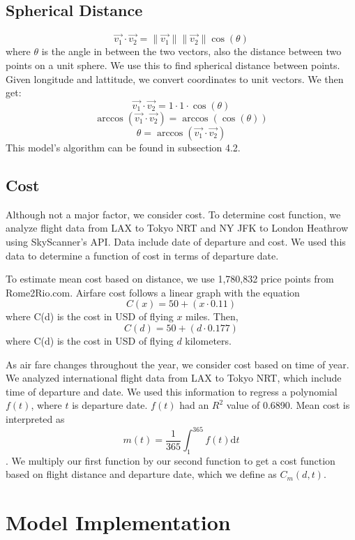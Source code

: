 \subsection{Spherical Distance}
$$\vec{v_1} \cdot \vec{v_2} = \|\vec{v_1}\| \|\vec{v_2}\| \cos(\theta)$$
where $\theta$ is the angle in between the two vectors, also the distance between two points on a unit sphere. We use this to find spherical distance between points. Given longitude and lattitude, we convert coordinates to unit vectors. We then get:
$$\vec{v_1} \cdot \vec{v_2} = 1 \cdot 1 \cdot \cos(\theta)$$
$$\arccos({\vec{v_1} \cdot \vec{v_2}}) = \arccos(\cos(\theta))$$
$$\theta = \arccos(\vec{v_1} \cdot \vec{v_2})$$
This model's algorithm can be found in subsection 4.2.

\subsection{Cost}
Although not a major factor, we consider cost. To determine cost function, we analyze flight data from LAX to Tokyo NRT and NY JFK to London Heathrow using SkyScanner's API. Data include date of departure and cost. We used this data to determine a function of cost in terms of departure date.


To estimate mean cost based on distance, we use 1,780,832 price points from Rome2Rio.com. Airfare cost follows a linear graph with the equation $$C(x) = 50 + (x \cdot 0.11)$$ where C(d) is the cost in USD of flying $x$ miles. Then, $$C(d) = 50 + (d \cdot  0.177)$$ where C(d) is the cost in USD of flying $d$ kilometers. 


As air fare changes throughout the year, we consider cost based on time of year. We analyzed international flight data from LAX to Tokyo NRT, which include time of departure and date. We used this information to regress a polynomial $f(t)$, where $t$ is departure date. $f(t)$ had an $R^2$ value of 0.6890. Mean cost is interpreted as
$$m(t) = \frac{1}{365} \int_1^{365}f(t) \mathrm{d} t $$. 
We multiply our first function by our second function to get a cost function based on flight distance and departure date, which we define as $C_m(d,t)$.

\newpage


\section{Model Implementation}

